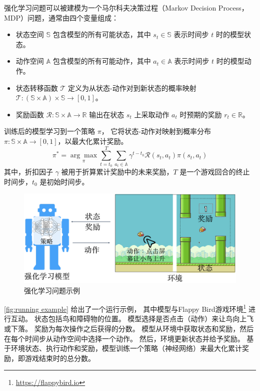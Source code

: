 强化学习问题可以被建模为一个马尔科夫决策过程（Markov Decision Process，MDP）问题，通常由四个变量组成：
\begin{itemize}
\item 状态空间 $\mathbb{S}$ 包含模型的所有可能状态，其中 $s_t \in \mathbb{S}$ 表示时间步 $t$ 时的模型状态。
\item 动作空间 $\mathbb{A}$ 包含模型的所有可能动作，其中 $a_t \in \mathbb{A}$ 表示时间步 $t$ 时的模型动作。
\item 状态转移函数 $\mathcal{T}$ 定义为从状态-动作对到新状态的概率映射 $\mathcal{T}: (\mathbb{S} \times \mathbb{A}) \times \mathbb{S} \rightarrow [0, 1]$。
\item 奖励函数 $\mathcal{R}: \mathbb{S} \times \mathbb{A} \rightarrow \mathbb{R}$ 输出在状态 $s_t$ 上采取动作 $a_t$ 时预期的奖励 $r_t \in \mathbb{R}$。
\end{itemize}
训练后的模型学习到一个策略 $\pi$，
它将状态-动作对映射到概率分布 $\pi: \mathbb{S} \times \mathbb{A} \rightarrow [0, 1]$，以最大化累计奖励。
\begin{equation}
    \pi^{*}=\underset{\pi}{\arg \max } \sum_{t=t_{0}}^{T} \sum_{a_{t} \in \mathbb{A}} \gamma^{t-t_{0}} \mathcal{R}\left(s_{t}, a_{t}\right) \pi\left(s_{t}, a_{t}\right)
\end{equation}
其中，折扣因子 $\gamma$ 被用于折算累计奖励中的未来奖励，$T$ 是一个游戏回合的终止时间步，$t_0$ 是初始时间步。

\begin{figure}[!t]
    \center
    \includegraphics[width=0.6\hsize]{figure/drl_hypertheif/fig-drl-examplech.pdf}
    \caption{强化学习问题示例}
    \label{fig:running example}
\end{figure}
\autoref{fig:running example} 给出了一个运行示例，
其中模型与Flappy Bird游戏环境\footnote{\url{https://flappybird.io}} 进行互动。
状态包括鸟和障碍物的位置。
模型选择是否点击（动作）来让鸟向上飞或下落。
奖励为每次操作之后获得的分数。
模型从环境中获取状态和奖励，然后在每个时间步从动作空间中选择一个动作。
然后，环境更新状态并给予奖励。
基于环境状态、执行动作和奖励，模型训练一个策略（神经网络）来最大化累计奖励，即游戏结束时的总分数。

